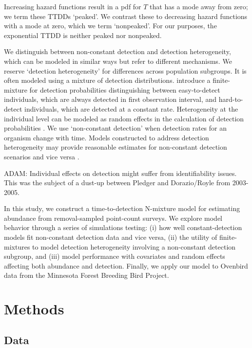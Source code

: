 \documentclass[useAMS,usenatbib,referee,12pt]{article}
\newcommand{\adam}[1]{{\color{blue} ADAM: #1}}
\begin{document}
Increasing hazard functions result in a pdf for $T$ that has a mode away from zero; we term these TTDDs `peaked'.  
We contrast these to decreasing hazard functions with a mode at zero, which we term `nonpeaked'.  
For our purposes, the exponential TTDD is neither peaked nor nonpeaked.

We distinguish between non-constant detection and detection heterogeneity, which can be modeled in similar ways but refer to different mechanisms.  
We reserve `detection heterogeneity' for differences across population subgroups.  
It is often modeled using a mixture of detection distributions.  
\citet{Farnsworth2002} introduce a finite-mixture for detection probabilities distinguishing between easy-to-detect individuals, which are always detected in first observation interval, and hard-to-detect individuals, which are detected at a constant rate.  
 Heterogeneity at the individual level can be modeled as random effects in the calculation of detection probabilities \citep{DorazioRoyle2003, Mantyniemi2005}.  
We use `non-constant detection' when detection rates for an organism change with time.  
Models constructed to address detection heterogeneity may provide reasonable estimates for non-constant detection scenarios and vice versa \citep{Mantyniemi2005}.

\adam{Individual effects on detection might suffer from identifiability issues. This was the subject of a dust-up between Pledger and Dorazio/Royle from 2003-2005.}

In this study, we construct a time-to-detection N-mixture model for estimating abundance from removal-sampled point-count surveys.  
We explore model behavior through a series of simulations testing: (i) how well constant-detection models fit non-constant detection data and vice versa, (ii) the utility of finite-mixtures to model detection heterogeneity involving a non-constant detection subgroup, and (iii) model performance with covariates and random effects affecting both abundance and detection.  
Finally, we apply our model to Ovenbird data from the Minnesota Forest Breeding Bird Project.




\section{Methods}\label{sec:model}

\subsection{Data}\label{sec:data}
\end{document}
